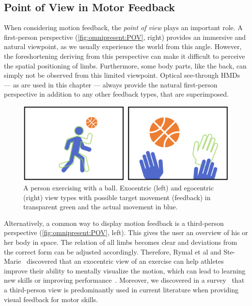 \subsection{Point of View in Motor Feedback\label{sec:omnipresent:POV}}
When considering motion feedback, the \emph{point of view} plays an important role. A first-person perspective (\autoref{fig:omnipresent:POV}, right) provides an immersive and natural viewpoint, as we usually experience the world from this angle. However, the foreshortening deriving from this perspective can make it difficult to perceive the spatial positioning of limbs. Furthermore, some body parts, like the back, can simply not be observed from this limited viewpoint. 
Optical see-through HMDs --- as are used in this chapter --- always provide the natural first-person perspective in addition to any other feedback types, that are superimposed.

\begin{figure}[h!]
	\centering
	\includegraphics[width=\linewidth]{pictures/PointOfView.PNG}
	\caption{A person exercising with a ball. Exocentric (left) and egocentric (right) view types with possible target movement (feedback) in transparent green and the actual movement in blue.\label{fig:omnipresent:POV}}
\end{figure}

Alternatively, a common way to display motion feedback is a third-person perspective (\autoref{fig:omnipresent:POV}, left). This gives the user an overview of his or her body in space. The relation of all limbs becomes clear and deviations from the correct form can be adjusted accordingly. Therefore, Rymal et al and Ste-Marie~\cite{rymal2009dsm} discovered that an exocentric view of an exercise can help athletes improve their ability to mentally visualize the motion, which can lead to learning new skills or improving performance~\cite{white1998ida}. Moreover, we discovered in a survey~\cite{diller2022vcb} that a third-person view is predominantly used in current literature when providing visual feedback for motor skills.

